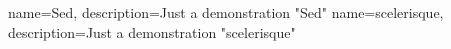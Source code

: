 {
  name={Sed},
  description={Just a demonstration "Sed"}
}
{
  name={scelerisque},
  description={Just a demonstration "scelerisque"}
}

